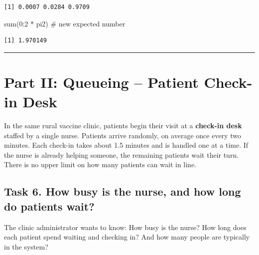 \documentclass[
]{article}
\newenvironment{Shaded}{\begin{snugshade}}{\end{snugshade}}
\newcommand{\CommentTok}[1]{\textcolor[rgb]{0.37,0.37,0.37}{#1}}
\newcommand{\DecValTok}[1]{\textcolor[rgb]{0.68,0.00,0.00}{#1}}
\newcommand{\FunctionTok}[1]{\textcolor[rgb]{0.28,0.35,0.67}{#1}}
\newcommand{\NormalTok}[1]{\textcolor[rgb]{0.00,0.23,0.31}{#1}}
\newcommand{\SpecialCharTok}[1]{\textcolor[rgb]{0.37,0.37,0.37}{#1}}
\begin{document}
\begin{verbatim}
[1] 0.0007 0.0284 0.9709
\end{verbatim}

\begin{Shaded}
\begin{Highlighting}[]
\FunctionTok{sum}\NormalTok{(}\DecValTok{0}\SpecialCharTok{:}\DecValTok{2} \SpecialCharTok{*}\NormalTok{ pi2)  }\CommentTok{\# new expected number}
\end{Highlighting}
\end{Shaded}

\begin{verbatim}
[1] 1.970149
\end{verbatim}

\begin{center}\rule{0.5\linewidth}{0.5pt}\end{center}

\section{Part II: Queueing -- Patient Check-in
Desk}\label{part-ii-queueing-patient-check-in-desk}

In the same rural vaccine clinic, patients begin their visit at a
\textbf{check-in desk} staffed by a single nurse. Patients arrive
randomly, on average once every two minutes. Each check-in takes about
1.5 minutes and is handled one at a time. If the nurse is already
helping someone, the remaining patients wait their turn. There is no
upper limit on how many patients can wait in line.

\subsection{Task 6. How busy is the nurse, and how long do patients
wait?}\label{task-6.-how-busy-is-the-nurse-and-how-long-do-patients-wait}

The clinic administrator wants to know: How busy is the nurse? How long
does each patient spend waiting and checking in? And how many people are
typically in the system?
\end{document}
